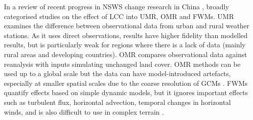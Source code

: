 %	
%	

In a review of recent progress in \ac{NSWS} change research in China \citep{zha2021}, broadly categorised studies on the effect of \ac{LCC} into \ac{UMR}, \ac{OMR} and \acp{FWM}. \ac{UMR} examines the difference between observational data from urban and rural weather stations. As it uses direct observations, results have higher fidelity than modelled results, but is particularly weak for regions where there is a lack of data (mainly rural areas and developing countries). \ac{OMR} compares observational data against reanalysis with inputs simulating unchanged land cover. \ac{OMR} methods can be used up to a global scale but the data can have model-introduced artefacts, especially at smaller spatial scales due to the coarse resolution of \acp{GCM} \citep{zha2021}. \acp{FWM} quantify effects based on simple dynamic models, but it ignores important effects such as turbulent flux, horizontal advection, temporal changes in horizontal winds, and is also difficult to use in complex terrain \citep{zha2021}.

